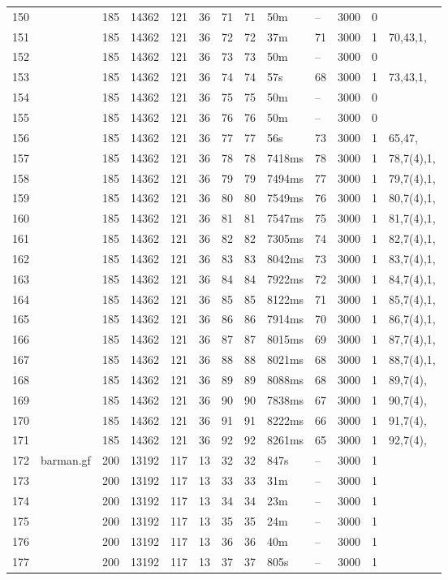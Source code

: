 \documentclass{article}
\begin{document}
\begin{longtable}{|l |l |l |l |l |l |l |l |l |l |l |l |l |}
150&&185&14362&121&36&71&71&50m&--&3000&0&\\
151&&185&14362&121&36&72&72&37m&71&3000&1&70,43,1,\\
152&&185&14362&121&36&73&73&50m&--&3000&0&\\
153&&185&14362&121&36&74&74&57s&68&3000&1&73,43,1,\\
154&&185&14362&121&36&75&75&50m&--&3000&0&\\
155&&185&14362&121&36&76&76&50m&--&3000&0&\\
156&&185&14362&121&36&77&77&56s&73&3000&1&65,47,\\
157&&185&14362&121&36&78&78&7418ms&78&3000&1&78,7(4),1,\\
158&&185&14362&121&36&79&79&7494ms&77&3000&1&79,7(4),1,\\
159&&185&14362&121&36&80&80&7549ms&76&3000&1&80,7(4),1,\\
160&&185&14362&121&36&81&81&7547ms&75&3000&1&81,7(4),1,\\
161&&185&14362&121&36&82&82&7305ms&74&3000&1&82,7(4),1,\\
162&&185&14362&121&36&83&83&8042ms&73&3000&1&83,7(4),1,\\
163&&185&14362&121&36&84&84&7922ms&72&3000&1&84,7(4),1,\\
164&&185&14362&121&36&85&85&8122ms&71&3000&1&85,7(4),1,\\
165&&185&14362&121&36&86&86&7914ms&70&3000&1&86,7(4),1,\\
166&&185&14362&121&36&87&87&8015ms&69&3000&1&87,7(4),1,\\
167&&185&14362&121&36&88&88&8021ms&68&3000&1&88,7(4),1,\\
168&&185&14362&121&36&89&89&8088ms&68&3000&1&89,7(4),\\
169&&185&14362&121&36&90&90&7838ms&67&3000&1&90,7(4),\\
170&&185&14362&121&36&91&91&8222ms&66&3000&1&91,7(4),\\
171&&185&14362&121&36&92&92&8261ms&65&3000&1&92,7(4),\\
172&barman.gf&200&13192&117&13&32&32&847s&--&3000&1&\\
173&&200&13192&117&13&33&33&31m&--&3000&1&\\
174&&200&13192&117&13&34&34&23m&--&3000&1&\\
175&&200&13192&117&13&35&35&24m&--&3000&1&\\
176&&200&13192&117&13&36&36&40m&--&3000&1&\\
177&&200&13192&117&13&37&37&805s&--&3000&1&\\

\end{longtable}
\end{document}
